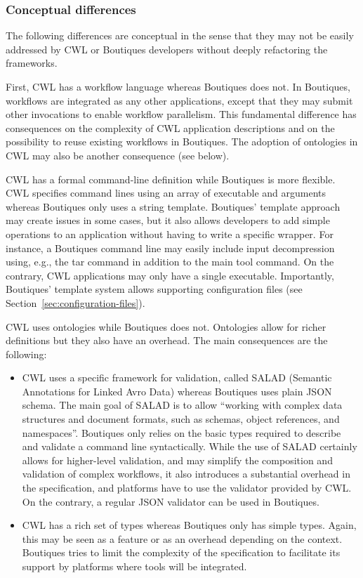 \documentclass{article}
\newcommand{\boutiques}{Boutiques\xspace}
\begin{document}
\subsubsection{Conceptual differences}

The following differences are conceptual in the sense that they may
not be easily addressed by CWL or Boutiques developers without deeply
refactoring the frameworks.

First, CWL has a workflow language whereas \boutiques does not. In
\boutiques, workflows are integrated as any other applications, except
that they may submit other invocations to enable workflow
parallelism. This fundamental difference has consequences on the
complexity of CWL application descriptions and on the possibility to
reuse existing workflows in \boutiques. The adoption of ontologies in
CWL may also be another consequence (see below).

CWL has a formal command-line definition while \boutiques is more
flexible. CWL specifies command lines using an array of executable and
arguments whereas \boutiques only uses a string template. \boutiques'
template approach may create issues in some cases, but it also allows
developers to add simple operations to an application without having
to write a specific wrapper. For instance, a \boutiques command line
may easily include input decompression using, e.g., the tar command in
addition to the main tool command. On the contrary, CWL applications
may only have a single executable. Importantly, \boutiques' template
system allows supporting configuration files (see
Section~\ref{sec:configuration-files}).

CWL uses ontologies while \boutiques does not. Ontologies allow for
richer definitions but they also have an overhead. The main
consequences are the following:
\begin{itemize}
\item CWL uses a specific framework for
validation, called SALAD (Semantic Annotations for Linked Avro Data)
whereas Boutiques uses plain JSON schema. The main goal of SALAD is to
allow ``working with complex data structures and document formats, such
as schemas, object references, and namespaces''. \boutiques only relies
on the basic types required to describe and validate a command line
syntactically. While the use of SALAD certainly allows for
higher-level validation, and may simplify the composition and
validation of complex workflows, it also introduces a substantial
overhead in the specification, and platforms have to use the validator
provided by CWL. On the contrary, a regular JSON validator can be used in \boutiques.
\item  CWL has a rich set of types whereas \boutiques only has simple
types. Again, this may be seen as a feature or as an overhead
depending on the context. \boutiques tries to limit the complexity of
the specification to facilitate its support by platforms where tools
will be integrated.
\end{itemize}
\end{document}
